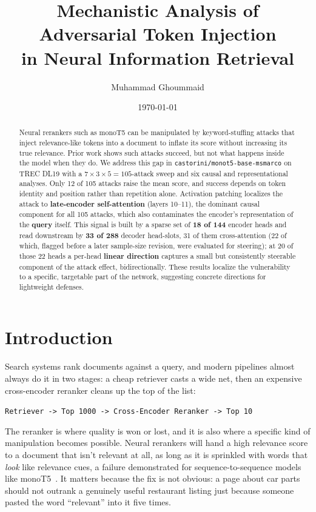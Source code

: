 \documentclass[11pt]{article}
\title{\textbf{Mechanistic Analysis of Adversarial Token Injection \\
in Neural Information Retrieval}}
\author{Muhammad Ghoummaid}
\date{\today}
\begin{document}
\maketitle

\begin{abstract}
Neural rerankers such as monoT5 can be manipulated by keyword-stuffing
attacks that inject relevance-like tokens into a document to inflate its
score without increasing its true relevance. Prior work shows such
attacks succeed, but not what happens inside the model when they do. We
address this gap in \texttt{castorini/monot5-base-msmarco} on TREC DL19
with a $7\times3\times5=105$-attack sweep and six causal and
representational analyses. Only 12 of 105 attacks raise the mean score,
and success depends on token identity and position rather than repetition
alone. Activation patching localizes the attack to \textbf{late-encoder
self-attention} (layers 10--11), the dominant causal component for all
105 attacks, which also contaminates the encoder's representation of the
\textbf{query} itself. This signal is built by a sparse set of
\textbf{18 of 144} encoder heads and read downstream by \textbf{33 of
288} decoder head-slots, 31 of them cross-attention (22 of which,
flagged before a later sample-size revision, were evaluated for
steering); at 20 of those 22 heads a per-head \textbf{linear direction}
captures a small but consistently steerable component of the attack
effect, bidirectionally. These results localize the vulnerability to a
specific, targetable part of the network, suggesting concrete
directions for lightweight defenses.
\end{abstract}

\section{Introduction}

Search systems rank documents against a query, and modern pipelines almost
always do it in two stages: a cheap retriever casts a wide net, then an
expensive cross-encoder reranker cleans up the top of the list:
\begin{center}
\verb|Retriever -> Top 1000 -> Cross-Encoder Reranker -> Top 10|
\end{center}
The reranker is where quality is won or lost, and it is also where a specific
kind of manipulation becomes possible. Neural rerankers will hand a high relevance
score to a document that isn't relevant at all, as long as it is sprinkled
with words that \emph{look} like relevance cues, a failure demonstrated for
sequence-to-sequence models like monoT5~\cite{parry2024adversarial}. It matters
because the fix is not obvious: a page about car parts should not outrank a
genuinely useful restaurant listing just because someone pasted the word
``relevant'' into it five times.
\end{document}
